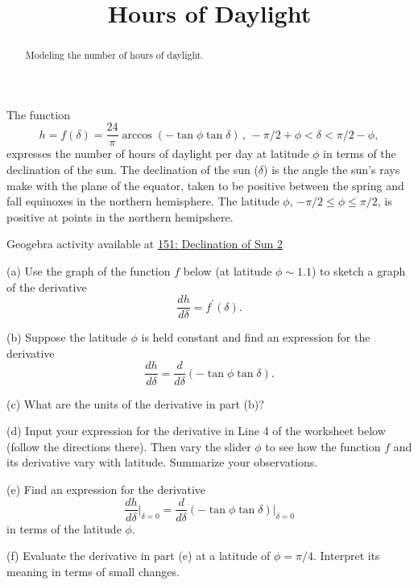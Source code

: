 \documentclass{ximera}
\title{Hours of Daylight}
\begin{document}
\begin{abstract}
Modeling the number of hours of daylight.
\end{abstract}
\maketitle


\begin{question}  \label{Q:er43455}
The function
\[
    h = f(\delta) = \frac{24}{\pi} \arccos(-\tan\phi \tan\delta) \, , \, -\pi/2+\phi < \delta < \pi/2-\phi ,
\]
expresses the number of hours of daylight per day at latitude $\phi$ in terms of the declination of the sun. The declination of the sun ($\delta$) is the angle the sun's rays make with the plane of the equator, taken to be positive between the spring and fall equinoxes in the northern hemisphere. The latitude $\phi$, $-\pi/2 \leq \phi \leq \pi/2$, is positive at points in the northern hemipshere.

\begin{onlineOnly}
    \begin{center}
\end{center}
\end{onlineOnly}

Geogebra activity available at \href{https://www.geogebra.org/classic/vnhrutwu}{151: Declination of Sun 2}


(a) Use the graph of the function $f$ below (at latitude $\phi \sim 1.1$) to sketch a graph of the derivative
\[
   \frac{dh}{d\delta} = f^\prime(\delta) .
\]

(b) Suppose the latitude $\phi$ is held constant and find an expression for the derivative 
\[
   \frac{dh}{d\delta} = \frac{d}{d\delta} \left(  -\tan\phi \tan \delta    \right).
\]

(c) What are the units of the derivative in part (b)?

(d) Input your expression for the derivative in Line 4 of the worksheet below (follow the directions there). Then vary the slider $\phi$ to see how the function $f$ and its derivative vary with latitude. Summarize your observations.

(e) Find an expression for the derivative 
\[
   \frac{dh}{d\delta}\Big|_{\delta = 0} =  \frac{d}{d\delta} \left(  -\tan\phi \tan \delta    \right)\Big|_{\delta =0}
\]
in terms of the latitude $\phi$. 

(f) Evaluate the derivative in part (e) at a latitude of $\phi =\pi/4$. Interpret its meaning in terms of small changes.


\end{question}
\end{document}
